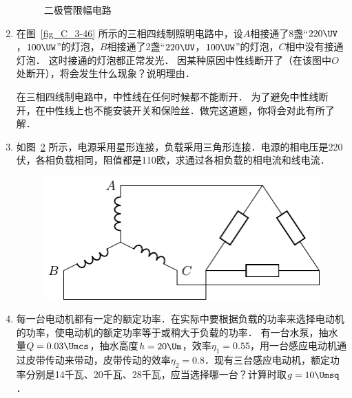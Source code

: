\begin{enumerate}
\begin{figure}[htbp]
        \caption{二极管限幅电路}\label{fig_C_3-60}
    \end{figure}
    \item 在图~\ref{fig_C_3-46} 所示的三相四线制照明电路中，设$A$相接通了8盏“$220\UV $，$ 100\UW$”的灯泡，$B$相接通了2盏“$220\UV $，$ 100\UW$”的灯泡，$C$相中没有接通灯泡．
    这时接通的灯泡都正常发光．
    因某种原因中性线断开了（在该图中$O$处断开），将会发生什么现象？说明理由．
    
    在三相四线制电路中，中性线在任何时候都不能断开．
    为了避免中性线断开，在中性线上也不能安装开关和保险丝．做完这道题，你将会对此有所了解．
    \item 如图~\ref{fig_C_3-61} 所示，电源采用星形连接，负载采用三角形连接．电源的相电压是220伏，各相负载相同，阻值都是110欧，求通过各相负载的相电流和线电流．
    \begin{figure}[htbp]
        \centering
        \includegraphics{fig/C/3-61.pdf}
        \caption{}\label{fig_C_3-61}
    \end{figure}
    \item 每一台电动机都有一定的额定功率．在实际中要根据负载的功率来选择电动机的功率，使电动机的额定功率等于或稍大于负载的功率．
    有一台水泵，抽水量$Q=0.03\Umcs $，抽水高度$h=20\Um $，效率$\eta_1=0.55$，用一台感应电动机通过皮带传动来带动，皮带传动的效率$\eta_2=0.8$．现有三台感应电动机，额定功率分别是14千瓦、20千瓦、28千瓦，应当选择哪一台？计算时取$g=10\Umsq$．
\end{enumerate}




